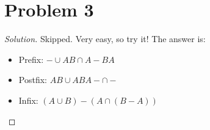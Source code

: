 \section*{Problem 3}
	\begin{proof} [Solution]
		Skipped. Very easy, so try it! The answer is:
		\begin{itemize}
			\item Prefix: $-\cup AB\cap A-BA$
			\item Postfix: $AB\cup ABA-\cap-$
			\item Infix: $(A\cup B) - (A\cap(B-A))$
		\end{itemize}
	\end{proof}